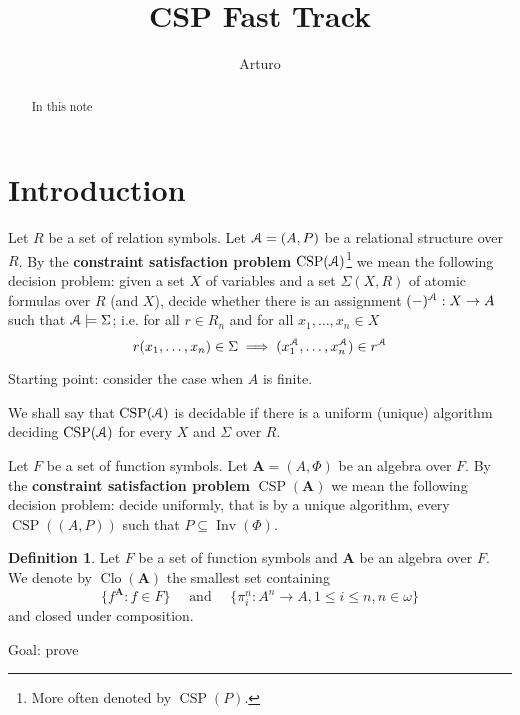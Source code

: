 \documentclass{amsart}
\theoremstyle{plain}
\theoremstyle{definition}
\newtheorem{definition}[theorem]{Definition}
\theoremstyle{remark}
\DeclareMathOperator{\Clo}{Clo}
\DeclareMathOperator{\CSP}{CSP}
\DeclareMathOperator{\Inv}{Inv}
\begin{document}
\title{CSP Fast Track}
\author{Arturo}


\begin{abstract}
   In this note 
\end{abstract}

\maketitle

\section{Introduction}
Let $R$ be a set of relation symbols. 
Let $\EuScript{A}=(A, P)$ be a relational structure over $R$.
By the \textbf{constraint satisfaction problem} $\CSP(\EuScript{A})$\footnote{More often denoted by $\CSP(P)$.} we mean the following decision problem: 
given a set $X$ of variables and a set $\Sigma(X,R)$ of atomic formulas  over $R$ (and $X$), decide whether there is 
an assignment $(-)^{\EuScript{A}} : X \to A$ such that 
$\EuScript{A} \models \Sigma$; 
i.e. for all $r \in R_n$ and for all $x_1, \ldots, x_n \in X$ 
\begin{equation}
    r(x_1, \ldots, x_n) \in \Sigma \implies  (x_1^{{\EuScript{A}}}, \ldots, x_n^{{\EuScript{A}}}) \in r^{\EuScript{A}}
\end{equation}

Starting point: consider the case when $A$ is finite. 

We shall say that $\CSP({\EuScript{A}})$ is decidable if there is a uniform (unique) algorithm deciding $\CSP({\EuScript{A}})$ for every $X$ and $\Sigma$ over $R$. 

Let $F$ be a set of function symbols. 
Let $\mathbf{A}=(A, \Phi)$ be an algebra over $F$. 
By the \textbf{constraint satisfaction problem} $\CSP(\mathbf{A})$ we mean the following decision problem:
decide uniformly, that is by a unique algorithm, every $\CSP((A,P))$ such that $P \subseteq \Inv(\Phi)$. 

\begin{definition}
    Let $F$ be a set of function symbols and $\mathbf{A}$ be an algebra over $F$. 
    We denote by $\Clo(\mathbf{A})$ the smallest set containing 
    \begin{equation*}
        \{f^\mathbf{A}: f \in F\} \quad \text{ and } \quad \{\pi^n_i: A^n \to A, 1 \le i \le n, n \in \omega\}
    \end{equation*}
and closed under composition. 
\end{definition}
Goal: prove 
\end{document}

